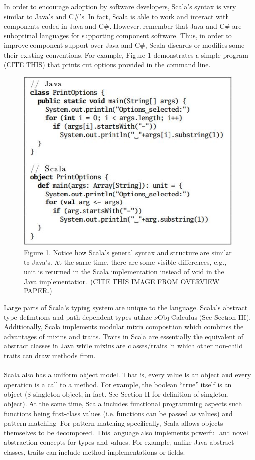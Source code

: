 \documentclass[jou,apacite]{IEEEtran}
\begin{document}
In order to encourage adoption by software developers, Scala's syntax is very similar to Java's and C\#'s. In fact, Scala is able to work and interact with components coded in Java and C\#. However, remember that Java and C\# are suboptimal languages for supporting component software. Thus, in order to improve component support over Java and C\#, Scala discards or modifies some their existing conventions. For example, Figure 1 demonstrates a simple program (CITE THIS) that prints out options provided in the command line.
\begin{figure}[h]
  \centering
  \includegraphics[width=\columnwidth]{exampl1.JPG}
  \caption{Figure 1. Notice how Scala's general syntax and structure are similar
    to Java's. At the same time, there are some visible differences, e.g., unit
    is returned in the Scala implementation instead of void in the Java
    implementation. (CITE THIS IMAGE FROM OVERVIEW PAPER.)}
  \label{fig:example}
\end{figure}

Large parts of Scala's typing system are unique to the language. Scala's abstract type definitions and path-dependent types utilize $\nu$Obj Calculus (See Section III). Additionally, Scala implements modular mixin composition which combines the advantages of mixins and traits. Traits in Scala are essentially the equivalent of abstract classes in Java while mixins are classes/traits in which other non-child traits can draw methods from. \\\\
Scala also has a uniform object model. That is, every value is an object and
every operation is a call to a method. For example, the boolean “true” itself is
an object (S singleton object, in fact. See Section II for definition of
singleton object). At the same time, Scala includes functional programming
aspects such functions being first-class values (i.e. functions can be passed as
values) and pattern matching. For pattern matching specifically, Scala allows
objects themselves to be decomposed. This language also implements powerful and
novel abstraction concepts for types and values. For example, unlike Java
abstract classes, traits can include method implementations or fields.
\end{document}
